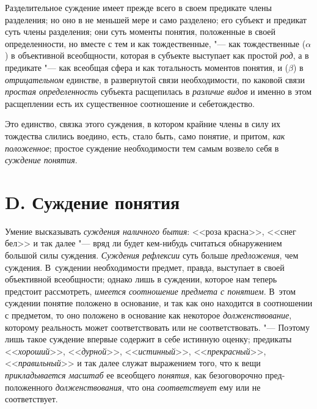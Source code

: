 {Разделительное суждение имеет прежде всего в своем предикате
члены разделения; но оно в не меньшей мере и само разделено; его субъект и
предикат суть члены разделения; они суть моменты понятия, положенные в
своей определенности, но вместе с тем и как тождественные, "---
как тождественные ($\alpha $) в объективной всеобщности,
которая в субъекте выступает как простой
{\em род}, а в предикате
"--- как всеобщая сфера и как тотальность моментов понятия, и
($\beta $) в {\em отрицательном}
единстве, в развернутой связи необходимости, по каковой связи
{\em простая определенность}
субъекта расщепилась в
{\em различие видов} и
именно в этом расщеплении есть их существенное соотношение и
себетождество.

Это единство, связка этого суждения, в котором крайние члены в
силу их тождества слились воедино, есть, стало быть, само понятие, и
притом, {\em как положенное};
простое суждение необходимости тем самым возвело себя в
{\em суждение понятия}.

\section[D. Суждение понятия]{D. Суждение понятия}
Умение высказывать
{\em суждения наличного бытия}:
<<роза красна>>, <<снег бел>> и так далее "--- вряд
ли будет кем-нибудь считаться обнаружением большой силы суждения.
{\em Суждения рефлексии}
суть больше
{\em предложения}, чем
суждения. В~суждении необходимости предмет, правда,
выступает в своей объективной всеобщности; однако лишь в суждении, которое
нам теперь предстоит рассмотреть,
{\em имеется соотношение предмета с
понятием}. В~этом суждении понятие положено в основание, и
так как оно находится в соотношении с предметом, то оно положено в
основание как некоторое
{\em долженствование},
которому реальность может соответствовать или не
соответствовать. "--- Поэтому лишь такое суждение впервые
содержит в себе истинную оценку; предикаты
<<{\em хороший}>>,
<<{\em дурной}>>,
<<{\em истинный}>>,
<<{\em прекрасный}>>,
<<{\em правильный}>> и так
далее служат выражением того, что к вещи
{\em прикладывается масштаб} ее всеобщего
{\em понятия}, как
безоговорочно пред-положенного
{\em долженствования},
что она
{\em соответствует} ему
или не соответствует.

}
